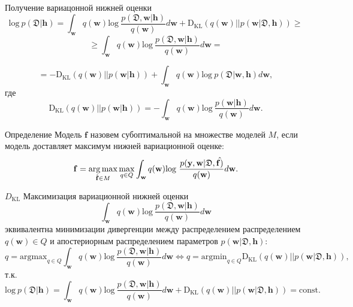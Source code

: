 \documentclass[usenames,dvipsnames,10pt,pdf,utf8,russian,aspectratio=43]{beamer}
\DeclareMathOperator*{\argmax}{arg\,max}
\begin{document}
\begin{frame}{Получение вариацонной нижней оценки}
$$
\text{log}~p(\mathfrak{D}| \mathbf{h})  = \int_{\mathbf{w}} q(\mathbf{w})\text{log}~\frac{p(\mathfrak{D},\mathbf{w}|\mathbf{h})}{q(\mathbf{w})}d\mathbf{w} + \text{D}_\text{KL}  (q(\mathbf{w})||p(\mathbf{w}| \mathfrak{D}, \mathbf{h})) \geq	
$$
$$
\geq \int_{\mathbf{w}} q(\mathbf{w})\text{log}~\frac{p(\mathfrak{D},\mathbf{w}|\mathbf{h})}{q(\mathbf{w})}d\mathbf{w} =
$$

$$
= -\text{D}_\text{KL} (q(\mathbf{w})||p(\mathbf{w}|\mathbf{h})) + \int_{\mathbf{w}} q(\mathbf{w})\text{log}~{p(\mathfrak{D}|\mathbf{w},\mathbf{h})} d \mathbf{w},
$$
где $$\text{D}_\text{KL}(q(\mathbf{w})||p(\mathbf{w} |\mathbf{h})) = -\int_{\mathbf{w}} q(\mathbf{w})\text{log}~\frac{p(\mathbf{w} | \mathbf{h})}{q(\mathbf{w})}d\mathbf{w}.$$
\begin{block}{Определение} Модель $\mathbf{f}$ назовем субоптимальной на множестве моделей $M$, если модель доставляет максимум нижней вариационной оценке:
\[
\label{eq:elbo2}
	\mathbf{f} = \argmax_{\hat{\mathbf{f}} \in M}\max_{q \in {Q}}\int_{\mathbf{w}} q(\mathbf{w})\textnormal{log}~\frac{p(\mathbf{y},\mathbf{w}|\mathfrak{D},\hat{\mathbf{f})}}{q(\mathbf{w})}d\mathbf{w}.
\]
\end{block}


\end{frame}

\begin{frame}{$D_\text{KL}$}
Максимизация вариационной нижней оценки $$\int_{\mathbf{w}} q(\mathbf{w})\text{log}~\frac{p(\mathfrak{D},\mathbf{w}|\mathbf{h})}{q(\mathbf{w})}d\mathbf{w}$$   эквивалентна минимизации дивергенции между распределением распределением $q(\mathbf{w}) \in Q$ и апостериорным распределением параметров $p(\mathbf{w}|\mathfrak{D}, \mathbf{h})$:
\[
q = \text{argmax}_{q \in Q}\int_{\mathbf{w}} q(\mathbf{w})\text{log}~\frac{p(\mathfrak{D},\mathbf{w}|\mathbf{h})}{q(\mathbf{w})}d\mathbf{w} \Leftrightarrow 	
q = \text{argmin}_{q \in Q} \text{D}_\text{KL}  (q(\mathbf{w})||p(\mathbf{w}| \mathfrak{D}, \mathbf{h})),
\]
т.к.
$$\text{log}~p(\mathfrak{D}| \mathbf{h})  = \int_{\mathbf{w}} q(\mathbf{w})\text{log}~\frac{p(\mathfrak{D},\mathbf{w}|\mathbf{h})}{q(\mathbf{w})}d\mathbf{w} + \text{D}_\text{KL}  (q(\mathbf{w})||p(\mathbf{w}| \mathfrak{D}, \mathbf{h})) = \text{const}.$$



\end{frame}
\end{document}

